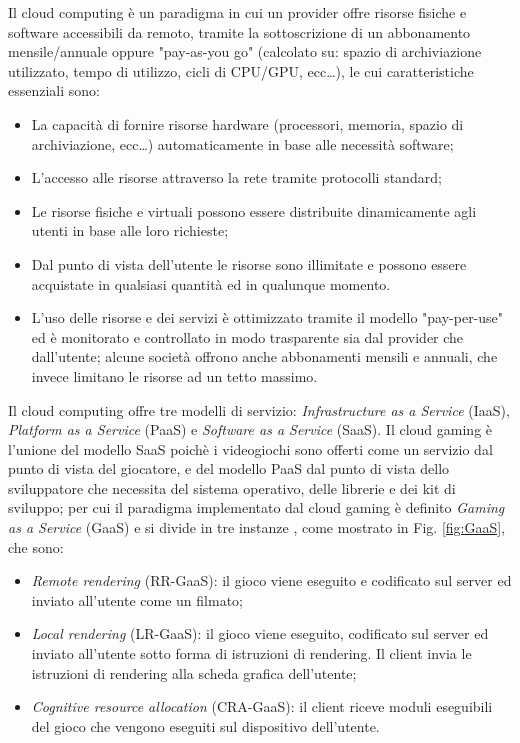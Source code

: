 Il cloud computing è un paradigma in cui un provider offre risorse fisiche e software accessibili da remoto, tramite la sottoscrizione di un abbonamento mensile/annuale oppure "pay-as-you go" (calcolato su: spazio di archiviazione utilizzato, tempo di utilizzo, cicli di CPU/GPU, ecc\dots), le cui caratteristiche essenziali sono:

\begin{itemize}
	\item La capacità di fornire risorse hardware (processori, memoria, spazio di archiviazione, ecc\dots) automaticamente in base alle necessità software;
	\item L'accesso alle risorse attraverso la rete tramite protocolli standard;
	\item Le risorse fisiche e virtuali possono essere distribuite dinamicamente agli utenti in base alle loro richieste;
	\item Dal punto di vista dell'utente le risorse sono illimitate e possono essere acquistate in qualsiasi quantità ed in qualunque momento.
	\item L'uso delle risorse e dei servizi è ottimizzato tramite il modello "pay-per-use" ed è monitorato e controllato in modo trasparente sia dal provider che dall'utente; alcune società offrono anche abbonamenti mensili e annuali, che invece limitano le risorse ad un tetto massimo.
\end{itemize}

Il cloud computing offre tre modelli di servizio: \textit{Infrastructure as a Service} (IaaS), \textit{Platform as a Service} (PaaS) e \textit{Software as a Service} (SaaS). Il cloud gaming è l'unione del modello SaaS poichè i videogiochi sono offerti come un servizio dal punto di vista del giocatore, e del modello PaaS dal punto di vista dello sviluppatore che necessita del sistema operativo, delle librerie e dei kit di sviluppo; per cui il paradigma implementato dal cloud gaming è definito \textit{Gaming as a Service} (GaaS) e si divide in tre instanze \parencite{Cloud_for_Gaming}, come mostrato in Fig. \ref{fig:GaaS}, che sono:

\begin{itemize}
	\item \textit{Remote rendering} (RR-GaaS): il gioco viene eseguito e codificato sul server ed inviato all'utente come un filmato;
	\item \textit{Local rendering} (LR-GaaS): il gioco viene eseguito, codificato sul server ed inviato all'utente sotto forma di istruzioni di rendering. Il client invia le istruzioni di rendering alla scheda grafica dell'utente;
	\item \textit{Cognitive resource allocation} (CRA-GaaS): il client riceve moduli eseguibili del gioco che vengono eseguiti sul dispositivo dell'utente.
\end{itemize}

